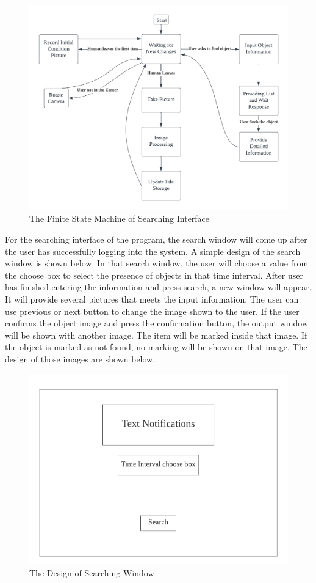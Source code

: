 \documentclass[12pt, titlepage]{article}
\begin{document}
\begin{figure}[H]
    \centering
    \includegraphics[scale=0.8]{FSM.png}
    \caption{The Finite State Machine of Searching Interface}
\end{figure}

For the searching interface of the program, the search window will come up after the user has successfully logging into the system. A simple design of the search window is shown below. In that search window, the user will choose a value from the choose box to select the presence of objects in that time interval. After user has finished entering the information and press search, a new window will appear. It will provide several pictures that meets the input information. The user can use previous or next button to change the image shown to the user. If the user confirms the object image and press the confirmation button, the output window will be shown with another image. The item will be marked inside that image. If the object is marked as not found, no marking will be shown on that image. The design of those images are shown below. 

\begin{figure}[H]
    \centering
    \includegraphics[scale=0.6]{Search.png}
    \caption{The Design of Searching Window}
\end{figure}
\end{document}

